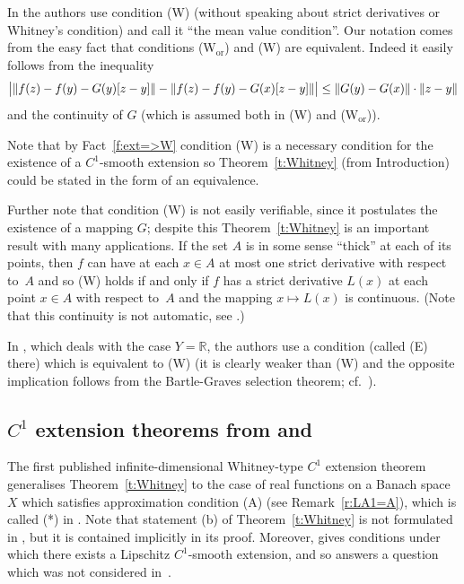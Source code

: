 \documentclass[a4paper,twoside,10pt,reqno,draft]{amsart}
\theoremstyle{definition}
\theoremstyle{remark}
\newcommand\absb[2]{\csname#1l\endcsname|#2\csname#1r\endcsname|}
\newcommand\norm[1]{\mathopen\|#1\mathclose\|}
\newcommand\R{{\mathbb R}}
\newcommand\cW{(W)}
\newcommand\cWor{(W$_{\mathrm{or}}$)}
\begin{document}
In \cite{JS2} the authors use condition {\cW} (without speaking about strict derivatives or Whitney's condition) and call it ``the mean value condition''.
Our notation comes from the easy fact that conditions {\cWor} and {\cW} are equivalent.
Indeed it easily follows from the inequality
\[
\absb{big}{\norm{f(z)-f(y)-G(y)[z-y]}-\norm{f(z)-f(y)-G(x)[z-y]}}\le\norm{G(y)-G(x)}\cdot\norm{z-y}
\]
and the continuity of $G$ (which is assumed both in {\cW} and {\cWor}).

Note that by Fact~\ref{f:ext=>W} condition {\cW} is a necessary condition for the existence of a $C^1$-smooth extension so Theorem~\ref{t:Whitney} (from Introduction) could be stated in the form of an equivalence.

Further note that condition {\cW} is not easily verifiable, since it postulates the existence of a mapping $G$; despite this Theorem~\ref{t:Whitney} is an important result with many applications.
If the set $A$ is in some sense ``thick'' at each of its points, then $f$ can have at each $x\in A$ at most one strict derivative with respect to~$A$
and so {\cW} holds if and only if $f$ has a strict derivative $L(x)$ at each point $x\in A$ with respect to~$A$ and the mapping $x\mapsto L(x)$ is continuous.
(Note that this continuity is not automatic, see \cite[Example~4.14]{KZ}.)

In \cite{JS1}, which deals with the case $Y=\R$, the authors use a condition (called (E) there) which is equivalent to {\cW}
(it is clearly weaker than {\cW} and the opposite implication follows from the Bartle-Graves selection theorem; cf.~\cite[Lemma~2]{AFK1}).

\subsection{\texorpdfstring{$C^1$ extension theorems from \cite{JS1} and \cite{JS2}}{C1 extension theorems from [JS1] and [JS2]}}\label{ss:Whitney_JS}

The first published infinite-dimensional Whitney-type $C^1$ extension theorem
\cite[Theorem A.2]{JS1} generalises Theorem~\ref{t:Whitney} to the case of real functions on a Banach space $X$ which satisfies approximation condition (A) (see Remark~\ref{r:LA1=A}),
which is called (*) in \cite[Theorem A.2]{JS1}.
Note that statement (b) of Theorem~\ref{t:Whitney} is not formulated in \cite[Theorem A.2]{JS1}, but it is contained implicitly in its proof.
Moreover, \cite[Theorem A.2]{JS1} gives conditions under which there exists a Lipschitz $C^1$-smooth extension, and so answers a question which was not considered in~\cite{Wh1}.
\end{document}
